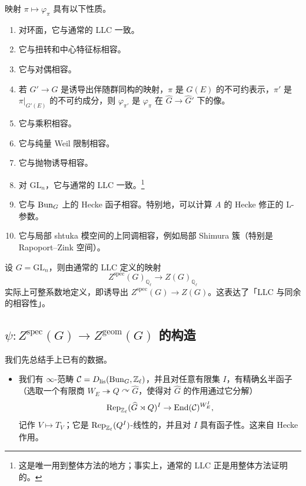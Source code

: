 \begin{proposition}[对应的性质]
映射 $\pi\mapsto\varphi_\pi$ 具有以下性质。
\begin{enumerate}[label=(\arabic*)]
\item 对环面，它与通常的 LLC 一致。
\item 它与扭转和中心特征标相容。
\item 它与对偶相容。
\item 若 $G'\to G$ 是诱导出伴随群同构的映射，$\pi$ 是 $G(E)$ 的不可约表示，$\pi'$ 是 $\pi|_{G'(E)}$ 的不可约成分，则 $\varphi_{\pi'}$ 是 $\varphi_\pi$ 在 $\widehat G\to\widehat G'$ 下的像。
\item 它与乘积相容。
\item 它与纯量 Weil 限制相容。
\item 它与抛物诱导相容。
\item 对 $\mathrm{GL}_n$，它与通常的 LLC 一致。\footnote{这是唯一用到整体方法的地方；事实上，通常的 LLC 正是用整体方法证明的。}
\item 它与 $\mathrm{Bun}_G$ 上的 Hecke 函子相容。特别地，可以计算 $A$ 的 Hecke 修正的 L-参数。
\item 它与局部 shtuka 模空间的上同调相容，例如局部 Shimura 簇（特别是 Rapoport--Zink 空间）。
\end{enumerate}
\end{proposition}

\begin{corollary}
设 $G=\mathrm{GL}_n$，则由通常的 LLC 定义的映射
\[
Z^{\mathrm{spec}}(G)_{\mathbb Q_\ell}\to Z(G)_{\mathbb Q_\ell}
\]
实际上可整系数地定义，即诱导出 $Z^{\mathrm{spec}}(G)\to Z(G)$。这表达了「LLC 与同余的相容性」。
\end{corollary}

\subsection{$\psi\colon Z^{\mathrm{spec}}(G)\to Z^{\mathrm{geom}}(G)$ 的构造}

我们先总结手上已有的数据。

\begin{itemize}
\item 我们有 $\infty$-范畴 $\mathcal C=D_{\mathrm{lis}}(\mathrm{Bun}_G,\mathbb Z_\ell)$，并且对任意有限集 $I$，有精确幺半函子（选取一个有限商 $W_E\twoheadrightarrow Q\curvearrowright\widehat G$，使得对 $\widehat G$ 的作用通过它分解）
\[
\operatorname{Rep}_{\mathbb Z_\ell}(\widehat G\rtimes Q)^I\to\operatorname{End}(\mathcal C)^{W_E^I},
\]
记作 $V\mapsto T_V$；它是 $\operatorname{Rep}_{\mathbb Z_\ell}(Q^I)$-线性的，并且对 $I$ 具有函子性。这来自 Hecke 作用。
\end{itemize}

